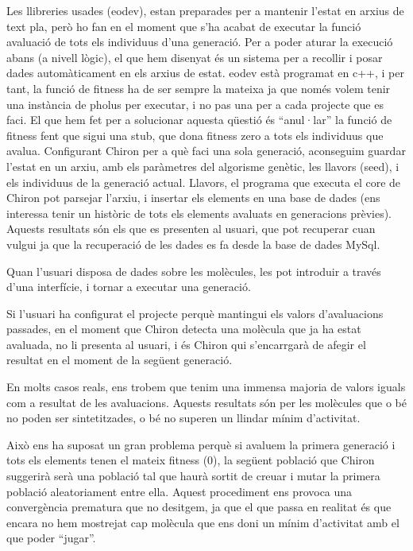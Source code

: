 Les llibreries usades (eodev), estan preparades per a mantenir l'estat en arxius
de text pla, però ho fan en el moment que s'ha acabat de executar la funció
avaluació de tots els individuus d'una generació.  Per a poder aturar la
execució abans (a nivell lògic), el que hem disenyat és un sistema per a
recollir i posar dades automàticament en els arxius de estat.  eodev està
programat en c++, i per tant, la funció de fitness ha de ser sempre la mateixa
ja que només volem tenir una instància de pholus per executar, i no pas una per
a cada projecte que es faci.  El que hem fet per a solucionar aquesta qüestió és
``anul·lar'' la funció de fitness fent que sigui una stub, que dona fitness zero
a tots els individuus que avalua.  Configurant Chiron per a què faci una sola
generació, aconseguim guardar l'estat en un arxiu, amb els paràmetres del
algorisme genètic, les llavors (seed), i els individuus de la generació actual.
Llavors, el programa que executa el core de Chiron pot parsejar l'arxiu, i
insertar els elements en una base de dades (ens interessa tenir un històric de
tots els elements avaluats en generacions prèvies).  Aquests resultats són els
que es presenten al usuari, que pot recuperar cuan vulgui ja que la recuperació
de les dades es fa desde la base de dades MySql.

Quan l'usuari disposa de dades sobre les molècules, les pot introduir a través
d'una interfície, i tornar a executar una generació.

Si l'usuari ha configurat el projecte perquè mantingui els valors d'avaluacions
passades, en el moment que Chiron detecta una molècula que ja ha estat avaluada,
no li presenta al usuari, i és Chiron qui s'encarrgarà de afegir el resultat en
el moment de la següent generació.


En  molts casos reals, ens trobem que tenim una immensa majoria de valors iguals
com a resultat de les avaluacions.  Aquests resultats són per les molècules que
o bé no poden ser sintetitzades, o bé no superen un llindar mínim d'activitat.

Això ens ha suposat un gran problema perquè si avaluem la primera generació i
tots els elements tenen el mateix fitness (0), la següent població que Chiron
suggerirà serà una població tal que haurà sortit de creuar i mutar la primera
població aleatoriament entre ella.  Aquest procediment ens provoca una
convergència prematura que no desitgem, ja que el que passa en realitat és que
encara no hem mostrejat cap molècula que ens doni un mínim d'activitat amb el
que poder ``jugar''.

